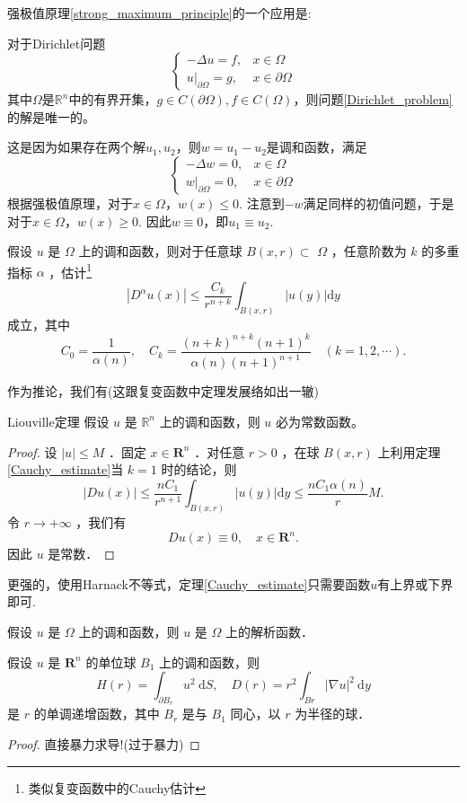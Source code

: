 \documentclass{mynote}
\begin{document}
强极值原理\ref{strong_maximum_principle}的一个应用是:

对于Dirichlet问题
\begin{equation}\label{Dirichlet_problem}
    \begin{cases}
        -\Delta u=f, & x\in \Omega\\
        u|_{\partial \Omega}=g, & x\in \partial \Omega
    \end{cases}
\end{equation}
其中$\Omega$是$\mathbb{R}^n$中的有界开集，$g\in C(\partial \Omega),f\in C(\Omega)$，则问题\ref{Dirichlet_problem}的解是唯一的。

这是因为如果存在两个解$u_1,u_2$，则$w=u_1-u_2$是调和函数，满足
\[
    \begin{cases}
        -\Delta w=0, & x\in \Omega\\
        w|_{\partial \Omega}=0, & x\in \partial \Omega
    \end{cases}
\]  
根据强极值原理，对于$x\in \Omega$，$w(x)\le 0$. 注意到$-w$满足同样的初值问题，于是对于$x\in \Omega$，$w(x)\ge 0$. 因此$w\equiv 0$，即$u_1\equiv u_2$.

\begin{theorem}\label{Cauchy_estimate}
    假设 $u$ 是 $\Omega$ 上的调和函数，则对于任意球 $B(x, r) \subset$ $\Omega$ ，任意阶数为 $k$ 的多重指标 $\alpha$ ，估计\footnote{类似复变函数中的Cauchy估计}
$$
\left|D^\alpha u(x)\right| \leq \frac{C_k}{r^{n+k}} \int_{B(x, r)}|u(y)| \mathrm{d} y
$$
成立，其中
$$
C_0=\frac{1}{\alpha(n)}, \quad C_k=\frac{(n+k)^{n+k}(n+1)^k}{\alpha(n)(n+1)^{n+1}} \quad(k=1,2, \cdots) .
$$
\end{theorem}
作为推论，我们有(这跟复变函数中定理发展络如出一辙)
\begin{theorem}{Liouville定理}
    假设 $u$ 是 $\mathbb{R}^n$ 上的调和函数，则 $u$ 必为常数函数。
\end{theorem}
\begin{proof}
    设 $|u| \leq M$ ．固定 $x \in \mathbf{R}^n$ ．对任意 $r>0$ ，在球 $B(x, r)$ 上利用定理\ref{Cauchy_estimate}当 $k=1$ 时的结论，则
$$
|D u(x)| \leq \frac{n C_1}{r^{n+1}} \int_{B(x, r)}|u(y)| \mathrm{d} y \leq \frac{n C_1 \alpha(n)}{r} M .
$$
令 $r \rightarrow+\infty$ ，我们有
$$
D u(x) \equiv 0, \quad x \in \mathbf{R}^n .
$$
因此 $u$ 是常数．
\end{proof}
更强的，使用Harnack不等式，定理\ref{Cauchy_estimate}只需要函数$u$有上界或下界即可.
\begin{theorem}
    假设 $u$ 是 $\Omega$ 上的调和函数，则 $u$ 是 $\Omega$ 上的解析函数．
\end{theorem}
\begin{theorem}
    假设 $u$ 是 $\mathbf{R}^n$ 的单位球 $B_1$ 上的调和函数，则
$$
H(r)=\int_{\partial B_r} u^2 \mathrm{~d} S, \quad D(r)=r^2 \int_{B r}|\nabla u|^2 \mathrm{~d} y
$$
是 $r$ 的单调递增函数，其中 $B_r$ 是与 $B_1$ 同心，以 $r$ 为半径的球．
\end{theorem}
\begin{proof}
    直接暴力求导!(过于暴力)
\end{proof}
\end{document}
